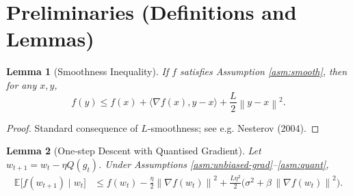 \documentclass[11pt]{article}
\newtheorem{lemma}{Lemma}
\newcommand{\EE}{\mathbb{E}}
\newcommand{\norm}[1]{\left\lVert#1\right\rVert}
\newcommand{\inner}[2]{\langle #1,#2\rangle}
\begin{document}
\newpage
\section*{Preliminaries (Definitions and Lemmas)}
\begin{lemma}[Smoothness Inequality]\label{lem:smooth}
If $f$ satisfies Assumption \ref{asm:smooth}, then for any $x,y$,
\[
f(y)\le f(x)+\inner{\nabla f(x)}{y-x}+\frac{L}{2}\norm{y-x}^2 .
\]
\end{lemma}
\begin{proof}
Standard consequence of $L$‑smoothness; see e.g. Nesterov (2004). \qedhere
\end{proof}

\begin{lemma}[One‑step Descent with Quantised Gradient]\label{lem:onestep}
Let $w_{t+1}=w_t-\eta Q(g_t)$.  Under Assumptions \ref{asm:unbiased-grad}–\ref{asm:quant},
\begin{align}
\EE\!\big[ f(w_{t+1})\mid w_t\big]
&\le f(w_t) -\frac{\eta}{2}\norm{\nabla f(w_t)}^2
+ \frac{L\eta^2}{2}\big(\sigma^2+\beta\,\norm{\nabla f(w_t)}^2\big).
\tag{4}
\end{align}
\end{lemma}
\end{document}
